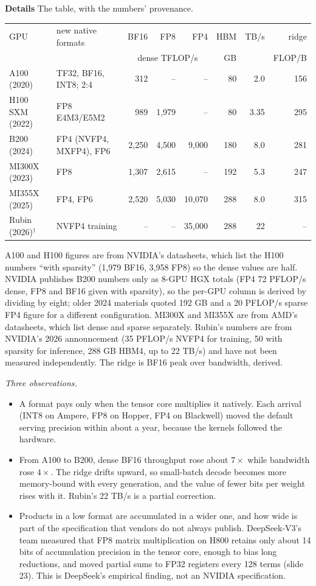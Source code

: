 \documentclass[11pt,letterpaper]{article}
\newcommand{\para}[1]{\medskip\noindent\textbf{#1}\quad}
\begin{document}
\para{Details} The table, with the numbers' provenance.
\begin{center}\small
\begin{tabular}{@{}llrrrrrr@{}}
\toprule
GPU & new native formats & BF16 & FP8 & FP4 & HBM & TB/s & ridge\\
& & \multicolumn{3}{c}{dense TFLOP/s} & GB & & FLOP/B\\
\midrule
A100 (2020) & TF32, BF16, INT8; 2:4 & 312 & -- & -- & 80 & 2.0 & 156\\
H100 SXM (2022) & FP8 E4M3/E5M2 & 989 & 1,979 & -- & 80 & 3.35 & 295\\
B200 (2024) & FP4 (NVFP4, MXFP4), FP6 & 2,250 & 4,500 & 9,000 & 180 & 8.0 & 281\\
MI300X (2023) & FP8 & 1,307 & 2,615 & -- & 192 & 5.3 & 247\\
MI355X (2025) & FP4, FP6 & 2,520 & 5,030 & 10,070 & 288 & 8.0 & 315\\
Rubin (2026)$^\dagger$ & NVFP4 training & -- & -- & 35,000 & 288 & 22 & --\\
\bottomrule
\end{tabular}
\end{center}
A100 and H100 figures are from NVIDIA's datasheets, which list the H100 numbers ``with sparsity'' (1,979 BF16, 3,958 FP8) so the dense values are half. NVIDIA publishes B200 numbers only as 8-GPU HGX totals (FP4 72 PFLOP/s dense, FP8 and BF16 given with sparsity), so the per-GPU column is derived by dividing by eight; older 2024 materials quoted 192 GB and a 20 PFLOP/s sparse FP4 figure for a different configuration. MI300X and MI355X are from AMD's datasheets, which list dense and sparse separately. Rubin's numbers are from NVIDIA's 2026 announcement (35 PFLOP/s NVFP4 for training, 50 with sparsity for inference, 288 GB HBM4, up to 22 TB/s) and have not been measured independently. The ridge is BF16 peak over bandwidth, derived.

\emph{Three observations.}
\begin{itemize}
  \item A format pays only when the tensor core multiplies it natively. Each arrival (INT8 on Ampere, FP8 on Hopper, FP4 on Blackwell) moved the default serving precision within about a year, because the kernels followed the hardware.
  \item From A100 to B200, dense BF16 throughput rose about $7\times$ while bandwidth rose $4\times$. The ridge drifts upward, so small-batch decode becomes more memory-bound with every generation, and the value of fewer bits per weight rises with it. Rubin's 22 TB/s is a partial correction.
  \item Products in a low format are accumulated in a wider one, and how wide is part of the specification that vendors do not always publish. DeepSeek-V3's team measured that FP8 matrix multiplication on H800 retains only about 14 bits of accumulation precision in the tensor core, enough to bias long reductions, and moved partial sums to FP32 registers every 128 terms (slide 23). This is DeepSeek's empirical finding, not an NVIDIA specification.
\end{itemize}
\end{document}
